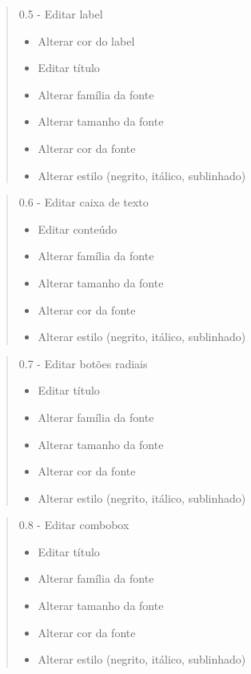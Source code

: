 \documentclass[10pt,a4paper]{article}
\begin{document}
\begin{quote}
0.5 - Editar label
\begin{itemize}
\item Alterar cor do label
\item Editar título
\item Alterar família da fonte
\item Alterar tamanho da fonte
\item Alterar cor da fonte
\item Alterar estilo (negrito, itálico, sublinhado)
\end{itemize}
\end{quote}
\begin{quote}
\newpage

0.6 - Editar caixa de texto
\begin{itemize}
\item Editar conteúdo
\item Alterar família da fonte
\item Alterar tamanho da fonte
\item Alterar cor da fonte
\item Alterar estilo (negrito, itálico, sublinhado)
\end{itemize}
\end{quote}

\begin{quote}
0.7 - Editar botões radiais
\begin{itemize}
\item Editar título
\item Alterar família da fonte
\item Alterar tamanho da fonte
\item Alterar cor da fonte
\item Alterar estilo (negrito, itálico, sublinhado)
\end{itemize}
\end{quote}

\begin{quote}
0.8 - Editar combobox
\begin{itemize}
\item Editar título
\item Alterar família da fonte
\item Alterar tamanho da fonte
\item Alterar cor da fonte
\item Alterar estilo (negrito, itálico, sublinhado)
\end{itemize}
\end{quote}
\end{document}
